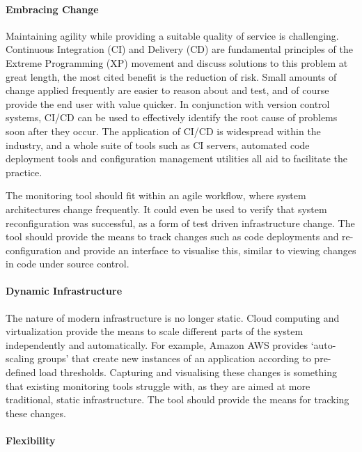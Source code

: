 \documentclass{cshonours}
\begin{document}
\paragraph{Embracing Change}

Maintaining agility while providing a suitable quality of service is challenging. Continuous Integration (CI) and Delivery (CD) are fundamental principles of the Extreme Programming (XP) movement and discuss solutions to this problem at great length, the most cited benefit is the reduction of risk. Small amounts of change applied frequently are easier to reason about and test, and of course provide the end user with value quicker. In conjunction with version control systems, CI/CD can be used to effectively identify the root cause of problems soon after they occur. The application of CI/CD is widespread within the industry, and a whole suite of tools such as CI servers, automated code deployment tools and configuration management utilities all aid to facilitate the practice.

The monitoring tool should fit within an agile workflow, where system architectures change frequently. It could even be used to verify that system reconfiguration was successful, as a form of test driven infrastructure change. The tool should provide the means to track changes such as code deployments and re-configuration and provide an interface to visualise this, similar to viewing changes in code under source control.

\paragraph{Dynamic Infrastructure}

The nature of modern infrastructure is no longer static. Cloud computing and virtualization provide the means to scale different parts of the system independently and automatically. For example, Amazon AWS provides `auto-scaling groups' that create new instances of an application according to pre-defined load thresholds. Capturing and visualising these changes is something that existing monitoring tools struggle with, as they are aimed at more traditional, static infrastructure. The tool should provide the means for tracking these changes.

\paragraph{Flexibility}
\end{document}

